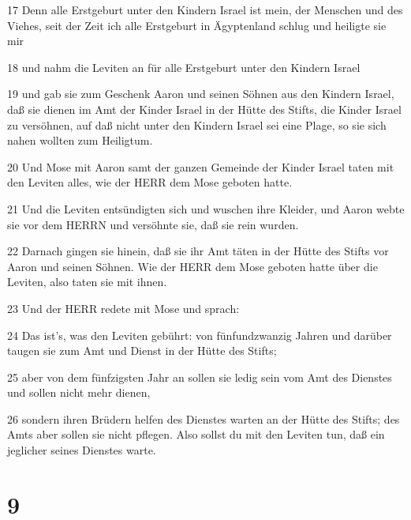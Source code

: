 \par 17 Denn alle Erstgeburt unter den Kindern Israel ist mein, der Menschen und des Viehes, seit der Zeit ich alle Erstgeburt in Ägyptenland schlug und heiligte sie mir
\par 18 und nahm die Leviten an für alle Erstgeburt unter den Kindern Israel
\par 19 und gab sie zum Geschenk Aaron und seinen Söhnen aus den Kindern Israel, daß sie dienen im Amt der Kinder Israel in der Hütte des Stifts, die Kinder Israel zu versöhnen, auf daß nicht unter den Kindern Israel sei eine Plage, so sie sich nahen wollten zum Heiligtum.
\par 20 Und Mose mit Aaron samt der ganzen Gemeinde der Kinder Israel taten mit den Leviten alles, wie der HERR dem Mose geboten hatte.
\par 21 Und die Leviten entsündigten sich und wuschen ihre Kleider, und Aaron webte sie vor dem HERRN und versöhnte sie, daß sie rein wurden.
\par 22 Darnach gingen sie hinein, daß sie ihr Amt täten in der Hütte des Stifts vor Aaron und seinen Söhnen. Wie der HERR dem Mose geboten hatte über die Leviten, also taten sie mit ihnen.
\par 23 Und der HERR redete mit Mose und sprach:
\par 24 Das ist's, was den Leviten gebührt: von fünfundzwanzig Jahren und darüber taugen sie zum Amt und Dienst in der Hütte des Stifts;
\par 25 aber von dem fünfzigsten Jahr an sollen sie ledig sein vom Amt des Dienstes und sollen nicht mehr dienen,
\par 26 sondern ihren Brüdern helfen des Dienstes warten an der Hütte des Stifts; des Amts aber sollen sie nicht pflegen. Also sollst du mit den Leviten tun, daß ein jeglicher seines Dienstes warte.

\chapter{9}

